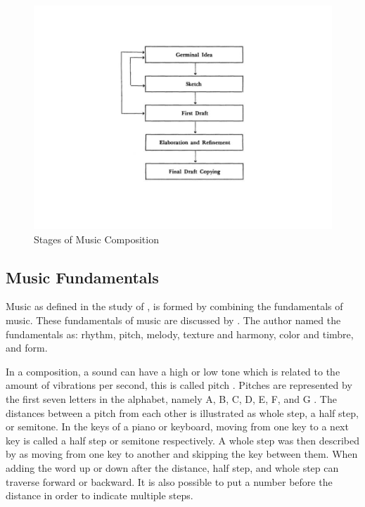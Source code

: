 \begin{figure}[H]
    \centering
    \includegraphics[width=12cm ]{figures/Composition.jpg}
    \caption{Stages of Music Composition \protect\cite{bennett1976process}}
    \label{fig:composition}
\end{figure}

\subsection{Music Fundamentals}
Music as defined in the study of , is formed by combining the fundamentals of music. These fundamentals of music are discussed by . The author named the fundamentals as: rhythm, pitch, melody, texture and harmony, color and timbre, and form. 

In a composition, a sound can have a high or low tone which is related to the amount of vibrations per second, this is called pitch \cite{rivadelo1986fundamentals}. Pitches are represented by the first seven letters in the alphabet, namely A, B, C, D, E, F, and G \cite{miller2005complete}. The distances between a pitch from each other is illustrated as whole step, a half step, or semitone. In the keys of a piano or keyboard, moving from one key to a next key is called a half step or semitone respectively. A whole step was then described by \citeauthor{rivadelo1986fundamentals} as moving from one key to another and skipping the key between them. When adding the word up or down after the distance, half step, and whole step can traverse forward or backward. It is also possible to put a number before the distance in order to indicate multiple steps. 

